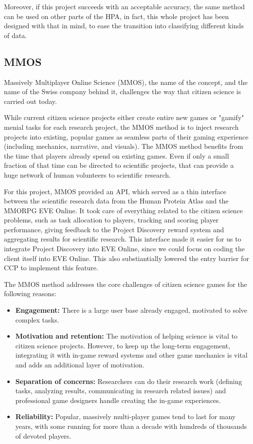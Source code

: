 	Moreover, if this project succeeds with an acceptable accuracy, the same method can be used on other parts of the HPA, in fact, this whole project has been designed with that in mind, to ease the transition into classifying different kinds of data. 


\subsection{MMOS}

	Massively Multiplayer Online Science (MMOS), the name of the concept, and the name of the Swiss company behind it, challenges the way that citizen science is carried out today. 

	While current citizen science projects either create entire new games or "gamify" menial tasks for each research project, the MMOS method is to inject research projects into existing, popular games as seamless parts of their gaming experience (including mechanics, narrative, and visuals). The MMOS method benefits from the time that players already spend on existing games. Even if only a small fraction of that time can be directed to scientific projects, that can provide a huge network of human volunteers to scientific research.

	For this project, MMOS provided an API, which served as a thin interface between the scientific research data from the Human Protein Atlas and the MMORPG EVE Online. It took care of everything related to the citizen science problems, such as task allocation to players, tracking and scoring player performance, giving feedback to the Project Discovery reward system and aggregating results for scientific research. This interface made it easier for us to integrate Project Discovery into EVE Online, since we could focus on coding the client itself into EVE Online. This also substiantially lowered the entry barrier for CCP to implement this feature.

	The MMOS method addresses the core challenges of citizen science games for the following reasons:

	\begin{itemize}
	  \item {\bf Engagement:} There is a large user base already engaged, motivated to solve complex tasks.
	  \item {\bf Motivation and retention:} The motivation of helping science is vital to citizen science projects. However, to keep up the long-term engagement, integrating it with in-game reward systems and other game mechanics is vital and adds an additional layer of motivation.
	  \item {\bf Separation of concerns:} Researchers can do their research work (defining tasks, analyzing results, communicating in research related issues) and professional game designers handle creating the in-game experiences.
	  \item {\bf Reliability:} Popular, massively multi-player games tend to last for many years, with some running for more than a decade with hundreds of thousands of devoted players.
	\end{itemize}

